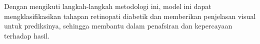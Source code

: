 %
%
%

Dengan mengikuti langkah-langkah metodologi ini, model ini dapat mengklasifikasikan tahapan retinopati diabetik dan memberikan penjelasan visual untuk prediksinya, sehingga membantu dalam penafsiran dan kepercayaan terhadap hasil.